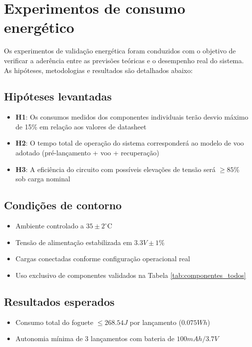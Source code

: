 
\section{Experimentos de consumo energético}

Os experimentos de validação energética foram conduzidos com o objetivo de verificar a aderência entre as previsões teóricas e o desempenho real do sistema. As hipóteses, metodologias e resultados são detalhados abaixo:

\subsection{Hipóteses levantadas}
\begin{itemize}
    \item \textbf{H1}: Os consumos medidos dos componentes individuais terão desvio máximo de 15\% em relação aos valores de datasheet
    \item \textbf{H2}: O tempo total de operação do sistema corresponderá ao modelo de voo adotado (pré-lançamento + voo + recuperação)
    \item \textbf{H3}: A eficiência do circuito com possíveis elevações de tensão será $\geq 85\%$ sob carga nominal
\end{itemize}

\subsection{Condições de contorno}
\begin{itemize}
    \item Ambiente controlado a $35 \pm 2^\circ$C
    \item Tensão de alimentação estabilizada em $3.3V \pm 1\%$
    \item Cargas conectadas conforme configuração operacional real
    \item Uso exclusivo de componentes validados na Tabela \ref{tab:componentes_todos}
\end{itemize}

\subsection{Resultados esperados}
\begin{itemize}
    \item Consumo total do foguete $\leq 268.54J$ por lançamento ($0.075Wh$)
    \item Autonomia mínima de 3 lançamentos com bateria de $100mAh/3.7V$
\end{itemize}

